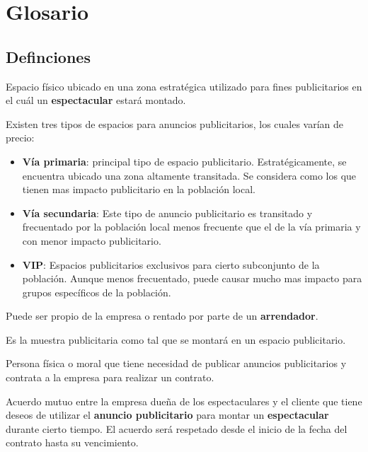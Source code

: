 
\chapter{Glosario}

\begin{description}[style=nextline]

\section{Definciones}

\item[Anuncio Publicitario]
Espacio físico ubicado en una zona estratégica utilizado para fines publicitarios en el cuál un \textbf{espectacular} estará montado.

Existen tres tipos de espacios para anuncios publicitarios, los cuales varían de precio:
\begin{itemize}
    \item \textbf{Vía primaria}: principal tipo de espacio publicitario. Estratégicamente, se encuentra ubicado una zona altamente transitada. Se considera como los que tienen mas impacto publicitario en la población local.
    \item \textbf{Vía secundaria}: Este tipo de anuncio publicitario es transitado y frecuentado por la población local menos frecuente que el de la vía primaria y con menor impacto publicitario.
    \item \textbf{VIP}: Espacios publicitarios exclusivos para cierto subconjunto de la población. Aunque menos frecuentado, puede causar mucho mas impacto para grupos específicos de la población.
\end{itemize}

Puede ser propio de la empresa o rentado por parte de un \textbf{arrendador}.

\item[Espectacular]
Es la muestra publicitaria como tal que se montará en un espacio publicitario. 

\item[Cliente]
Persona física o moral que tiene necesidad de publicar anuncios publicitarios y contrata a la empresa para realizar un contrato.

\item[Contrato]
Acuerdo mutuo entre la empresa dueña de los espectaculares y el cliente que tiene deseos de utilizar el \textbf{anuncio publicitario} para montar un \textbf{espectacular} durante cierto tiempo. El acuerdo será respetado desde el inicio de la fecha del contrato hasta su vencimiento.


\end{description}
